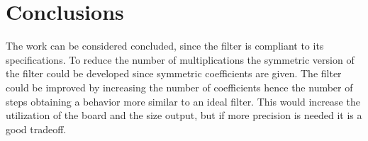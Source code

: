 \section{Conclusions}
The work can be considered concluded, since the filter is compliant to its specifications. To reduce the number of multiplications the symmetric version of the filter could be developed since symmetric coefficients are given. The filter could be improved by increasing the number of coefficients hence the number of steps obtaining a behavior more similar to an ideal filter. This would increase the utilization of the board and the size output, but if more precision is needed it is a good tradeoff.
